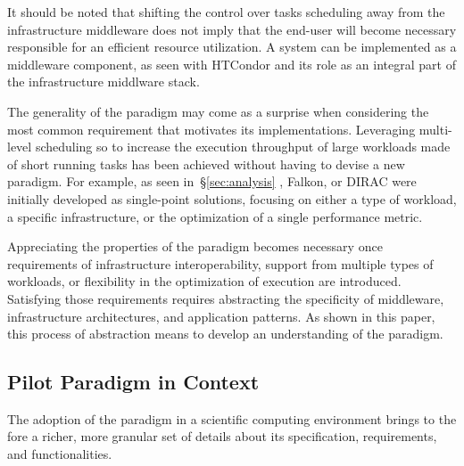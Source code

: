 \documentclass{sig-alternate}
\begin{document}
It should be noted that shifting the control over tasks scheduling away from
the infrastructure middleware does not imply that the end-user will become
necessary responsible for an efficient resource utilization. A \pilot system
can be implemented as a middleware component, as seen with HTCondor and its
role as an integral part of the infrastructure middlware stack.

The generality of the \pilot paradigm may come as a surprise when considering
the most common requirement that motivates its implementations. Leveraging
multi-level scheduling so to increase the execution throughput of large
workloads made of short running tasks has been achieved without having to
devise a new paradigm. For example, as seen in~\S\ref{sec:analysis} \panda,
Falkon, or DIRAC were initially developed as single-point solutions, focusing
on either a type of workload, a specific infrastructure, or the optimization of
a single performance metric.

Appreciating the properties of the \pilot paradigm becomes necessary once
requirements of infrastructure interoperability, support from multiple types of
workloads, or flexibility in the optimization of execution are introduced.
Satisfying those requirements requires abstracting the specificity of
middleware, infrastructure architectures, and application patterns. As shown in
this paper, this process of abstraction means to develop an understanding of
the \pilot paradigm.


%
\subsection{Pilot Paradigm in Context}
\label{sec:context}

The adoption of the \pilot paradigm in a scientific computing environment
brings to the fore a richer, more granular set of details about its
specification, requirements, and functionalities.

\end{document}

